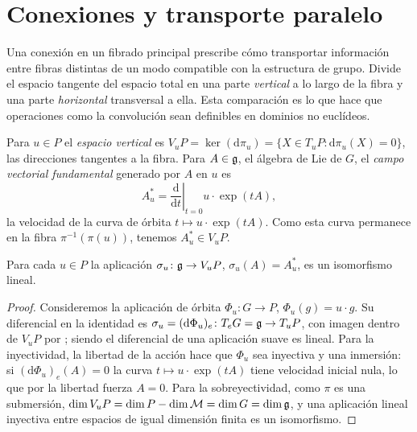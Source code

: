 \section{Conexiones y transporte paralelo}
\label{sec:gauge:transport}

Una conexi\'on en un fibrado principal prescribe c\'omo transportar informaci\'on
entre fibras distintas de un modo compatible con la estructura de grupo. Divide
el espacio tangente del espacio total en una parte \emph{vertical} a lo largo de
la fibra y una parte \emph{horizontal} transversal a ella. Esta comparaci\'on es
lo que hace que operaciones como la convoluci\'on sean definibles en dominios no
eucl\'ideos.

\begin{definition}
\label{def:gauge:vertical}
Para $u \in P$ el \emph{espacio vertical} es
$V_u P = \ker(\mathrm{d}\pi_u) = \{X \in T_u P : \mathrm{d}\pi_u(X) = 0\}$, las
direcciones tangentes a la fibra. Para $A \in \mathfrak{g}$, el \'algebra de Lie de
$G$, el \emph{campo vectorial fundamental} generado por $A$ en $u$ es
\[
  A^*_u = \left.\frac{\mathrm{d}}{\mathrm{d}t}\right|_{t=0} u \cdot \exp(tA),
\]
la velocidad de la curva de \'orbita $t \mapsto u \cdot \exp(tA)$. Como esta
curva permanece en la fibra $\pi^{-1}(\pi(u))$, tenemos $A^*_u \in V_u P$.
\end{definition}

\begin{proposition}
\label{prop:gauge:vertical-iso}
Para cada $u \in P$ la aplicaci\'on $\sigma_u\colon \mathfrak{g} \to V_u P$,
$\sigma_u(A) = A^*_u$, es un isomorfismo lineal.
\end{proposition}

\begin{proof}
Consideremos la aplicaci\'on de \'orbita $\Phi_u\colon G \to P$, $\Phi_u(g) = u
\cdot g$. Su diferencial en la identidad es $\sigma_u = (\mathrm{d}\Phi_u)_e\colon
T_e G = \mathfrak{g} \to T_u P$, con imagen dentro de $V_u P$ por
; siendo el diferencial de una aplicaci\'on suave es
lineal. Para la inyectividad, la libertad de la acci\'on hace que $\Phi_u$ sea
inyectiva y una inmersi\'on: si $(\mathrm{d}\Phi_u)_e(A) = 0$ la curva
$t \mapsto u \cdot \exp(tA)$ tiene velocidad inicial nula, lo que por la libertad
fuerza $A = 0$. Para la sobreyectividad, como $\pi$ es una submersi\'on,
$\dim V_u P = \dim P - \dim \mathcal{M} = \dim G = \dim \mathfrak{g}$, y una aplicaci\'on
lineal inyectiva entre espacios de igual dimensi\'on finita es un isomorfismo.
\end{proof}

